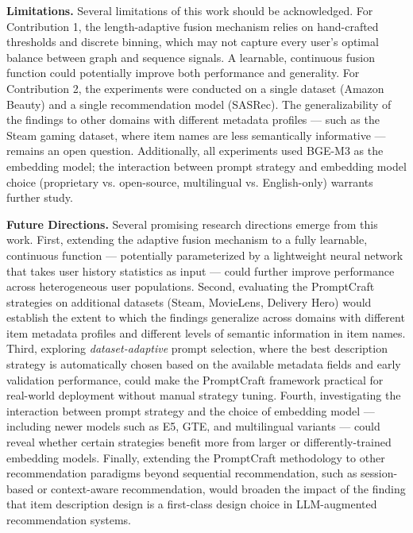\documentclass[12pt,a4paper]{report}
\begin{document}
\textbf{Limitations.} Several limitations of this work should be acknowledged.
For Contribution 1, the length-adaptive fusion mechanism relies on hand-crafted
thresholds and discrete binning, which may not capture every user's optimal
balance between graph and sequence signals. A learnable, continuous fusion
function could potentially improve both performance and generality. For
Contribution 2, the experiments were conducted on a single dataset (Amazon
Beauty) and a single recommendation model (SASRec). The generalizability of the
findings to other domains with different metadata profiles — such as the Steam
gaming dataset, where item names are less semantically informative — remains an
open question. Additionally, all experiments used BGE-M3 as the embedding
model; the interaction between prompt strategy and embedding model choice
(proprietary vs. open-source, multilingual vs. English-only) warrants further
study.

\textbf{Future Directions.} Several promising research directions emerge from
this work. First, extending the adaptive fusion mechanism to a fully learnable,
continuous function — potentially parameterized by a lightweight neural network
that takes user history statistics as input — could further improve performance
across heterogeneous user populations. Second, evaluating the PromptCraft
strategies on additional datasets (Steam, MovieLens, Delivery Hero) would
establish the extent to which the findings generalize across domains with
different item metadata profiles and different levels of semantic information
in item names. Third, exploring \emph{dataset-adaptive} prompt selection, where
the best description strategy is automatically chosen based on the available
metadata fields and early validation performance, could make the PromptCraft
framework practical for real-world deployment without manual strategy tuning.
Fourth, investigating the interaction between prompt strategy and the choice of
embedding model — including newer models such as E5, GTE, and multilingual
variants — could reveal whether certain strategies benefit more from
larger or differently-trained embedding models. Finally, extending the
PromptCraft methodology to other recommendation paradigms beyond sequential
recommendation, such as session-based or context-aware recommendation, would
broaden the impact of the finding that item description design is a first-class
design choice in LLM-augmented recommendation systems.


\newpage
\printbibliography[heading=bibintoc, title={References}]
\end{document}
